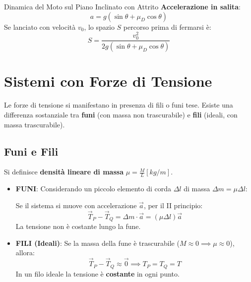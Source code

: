 \begin{esercizio}{Dinamica del Moto sul Piano Inclinato con Attrito}
\textbf{Accelerazione in salita}:
\begin{equation}
    a = g(\sin\theta + \mu_D \cos\theta)
\end{equation}
Se lanciato con velocità $v_0$, lo spazio $S$ percorso prima di fermarsi è:
\begin{equation}
    S = \frac{v_0^2}{2g(\sin\theta + \mu_D \cos\theta)}
\end{equation}
\end{esercizio}

\section{Sistemi con Forze di Tensione}
Le forze di tensione si manifestano in presenza di fili o funi tese. Esiste una differenza sostanziale tra \textbf{funi} (con massa non trascurabile) e \textbf{fili} (ideali, con massa trascurabile).

\subsection{Funi e Fili}
Si definisce \textbf{densità lineare di massa} $\mu = \frac{M}{L} [kg/m]$.

\begin{itemize}
    \item \textbf{FUNI}: Considerando un piccolo elemento di corda $\Delta l$ di massa $\Delta m = \mu \Delta l$:
    
    \begin{center}
    \end{center}
    
    Se il sistema si muove con accelerazione $\vec{a}$, per il II principio:
    \begin{equation}
    \vec{T}_P - \vec{T}_Q = \Delta m \cdot \vec{a} = (\mu \Delta l) \vec{a}
\end{equation}
    La tensione non è costante lungo la fune.
    
    \item \textbf{FILI (Ideali)}: Se la massa della fune è trascurabile ($M \approx 0 \implies \mu \approx 0$), allora:
    \begin{equation}
    \vec{T}_P - \vec{T}_Q \approx \vec{0} \implies T_P = T_Q = T
\end{equation}
    In un filo ideale la tensione è \textbf{costante} in ogni punto.
\end{itemize}

